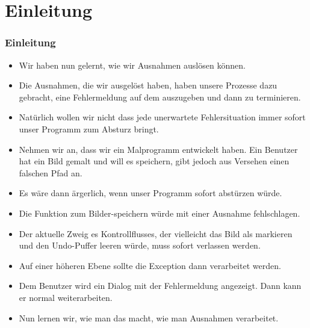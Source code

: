 \documentclass[aspectratio=169,mathserif,notheorems]{beamer}%
\subtitle{32.~Ausnahmen verarbeiten)}%
\begin{document}
%
%
\startPresentation%
%
\section{Einleitung}%
\begin{frame}%
\frametitle{Einleitung}%
\begin{itemize}%
\item Wir haben nun gelernt, wie wir Ausnahmen auslösen können.%
%
\item<2-> Die Ausnahmen, die wir ausgelöst haben, haben unsere Prozesse dazu gebracht, eine Fehlermeldung auf dem  auszugeben und dann zu terminieren.%
%
\item<3-> Natürlich wollen wir nicht dass jede unerwartete Fehlersituation immer sofort unser Programm zum Absturz bringt.%
%
\item<4-> Nehmen wir an, dass wir ein Malprogramm entwickelt haben. Ein Benutzer hat ein Bild gemalt und will es speichern, gibt jedoch aus Versehen einen falschen Pfad an.%
%
\item<5-> Es wäre dann ärgerlich, wenn unser Programm sofort abstürzen würde.%
%
\item<6-> Die Funktion zum Bilder-speichern würde mit einer Ausnahme fehlschlagen.%
%
\item<7-> Der aktuelle Zweig es Kontrollflusses, der vielleicht das Bild als  markieren und den Undo-Puffer leeren würde, muss sofort verlassen werden.%
%
\item<8-> Auf einer höheren Ebene sollte die Exception dann verarbeitet werden.%
%
\item<9-> Dem Benutzer wird ein Dialog mit der Fehlermeldung angezeigt. Dann kann er normal weiterarbeiten.%
%
\item<10-> Nun lernen wir, wie man das macht, \alert{wie man Ausnahmen verarbeitet}.%
\end{itemize}%
\end{frame}%
%
\end{document}
